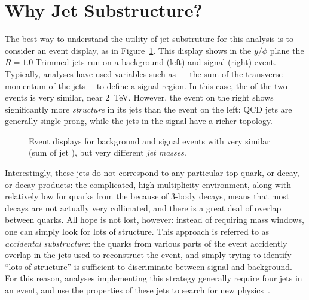 
\section{Why Jet Substructure?}

The best way to understand the utility of jet substruture for this analysis is to consider an event display, as in Figure~\ref{fig:search:motivation:event-displays}. This display shows in the $y/\phi$ plane the \antikt $R=1.0$ Trimmed jets run on a background (left) and signal (right) event. Typically, analyses have used variables such as \Ht--- the sum of the transverse momentum of the jets--- to define a signal region. In this case, the \Ht of the two events is very similar, near $2$~TeV. However, the event on the right shows significantly more \textit{structure} in its jets than the event on the left: QCD jets are generally single-prong, while the jets in the signal have a richer topology.  


\begin{figure}
\centering
{}
\label{fig:search:motivation:event-displays}
\caption{Event displays for background and signal events with very similar \Ht (sum of jet \pt), but very different \textit{jet masses}.}
\end{figure}


Interestingly, these \largeR jets do not correspond to any particular top quark, or \lsp decay, or \gl decay products: the complicated, high multiplicity environment, along with relatively low \pt for quarks from the \lsp because of 3-body decays, means that most decays are not actually very collimated, and there is a great deal of overlap between quarks. All hope is not lost, however: instead of requiring mass windows, one can simply look for lots of structure. This approach is referred to as \textit{accidental substructure}: the quarks from various parts of the event accidently overlap in the \largeR jets used to reconstruct the event, and simply trying to identify ``lots of structure'' is sufficient to discriminate between signal and background. For this reason, analyses implementing this strategy generally require four \largeR jets in an event, and use the properties of these jets to search for new physics~\cite{Hook:2012fd,Cohen:2012yc}.

